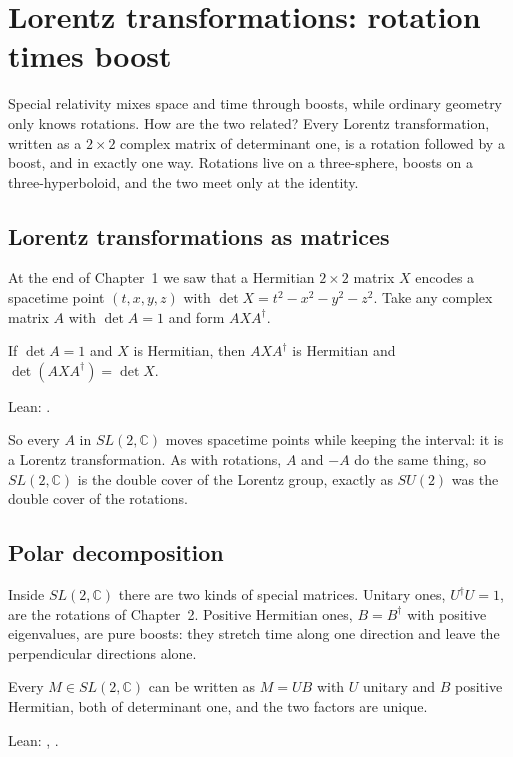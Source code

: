 \chapter{Lorentz transformations: rotation times boost}\label{ch:polar}

\begin{questionbox}
Special relativity mixes space and time through boosts, while ordinary geometry only knows rotations. How are the two related? Every Lorentz transformation, written as a $2\times2$ complex matrix of determinant one, is a rotation followed by a boost, and in exactly one way. Rotations live on a three-sphere, boosts on a three-hyperboloid, and the two meet only at the identity.
\end{questionbox}

\section{Lorentz transformations as matrices}

At the end of Chapter~1 we saw that a Hermitian $2\times2$ matrix $X$ encodes a spacetime point $(t,x,y,z)$ with $\det X=t^2-x^2-y^2-z^2$. Take any complex matrix $A$ with $\det A=1$ and form $AXA^\dagger$.

\begin{proposition}\proved
If $\det A=1$ and $X$ is Hermitian, then $AXA^\dagger$ is Hermitian and $\det(AXA^\dagger)=\det X$.
\end{proposition}
\noindent Lean: .

So every $A$ in $SL(2,\mathbb C)$ moves spacetime points while keeping the interval: it is a Lorentz transformation. As with rotations, $A$ and $-A$ do the same thing, so $SL(2,\mathbb C)$ is the double cover of the Lorentz group, exactly as $SU(2)$ was the double cover of the rotations.

\section{Polar decomposition}

Inside $SL(2,\mathbb C)$ there are two kinds of special matrices. Unitary ones, $U^\dagger U=1$, are the rotations of Chapter~2. Positive Hermitian ones, $B=B^\dagger$ with positive eigenvalues, are pure boosts: they stretch time along one direction and leave the perpendicular directions alone.

\begin{theorem}\proved\label{thm:polar}
Every $M\in SL(2,\mathbb C)$ can be written as $M=UB$ with $U$ unitary and $B$ positive Hermitian, both of determinant one, and the two factors are unique.
\end{theorem}
\noindent Lean: , .


